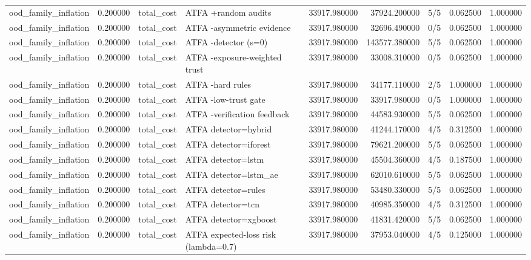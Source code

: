 \begin{tabular}{lrllrrlrr}
ood\_family\_inflation & 0.200000 & total\_cost & ATFA +random audits & 33917.980000 & 37924.200000 & 5/5 & 0.062500 & 1.000000 \\
ood\_family\_inflation & 0.200000 & total\_cost & ATFA -asymmetric evidence & 33917.980000 & 32696.490000 & 0/5 & 0.062500 & 1.000000 \\
ood\_family\_inflation & 0.200000 & total\_cost & ATFA -detector (s=0) & 33917.980000 & 143577.380000 & 5/5 & 0.062500 & 1.000000 \\
ood\_family\_inflation & 0.200000 & total\_cost & ATFA -exposure-weighted trust & 33917.980000 & 33008.310000 & 0/5 & 0.062500 & 1.000000 \\
ood\_family\_inflation & 0.200000 & total\_cost & ATFA -hard rules & 33917.980000 & 34177.110000 & 2/5 & 1.000000 & 1.000000 \\
ood\_family\_inflation & 0.200000 & total\_cost & ATFA -low-trust gate & 33917.980000 & 33917.980000 & 0/5 & 1.000000 & 1.000000 \\
ood\_family\_inflation & 0.200000 & total\_cost & ATFA -verification feedback & 33917.980000 & 44583.930000 & 5/5 & 0.062500 & 1.000000 \\
ood\_family\_inflation & 0.200000 & total\_cost & ATFA detector=hybrid & 33917.980000 & 41244.170000 & 4/5 & 0.312500 & 1.000000 \\
ood\_family\_inflation & 0.200000 & total\_cost & ATFA detector=iforest & 33917.980000 & 79621.200000 & 5/5 & 0.062500 & 1.000000 \\
ood\_family\_inflation & 0.200000 & total\_cost & ATFA detector=lstm & 33917.980000 & 45504.360000 & 4/5 & 0.187500 & 1.000000 \\
ood\_family\_inflation & 0.200000 & total\_cost & ATFA detector=lstm\_ae & 33917.980000 & 62010.610000 & 5/5 & 0.062500 & 1.000000 \\
ood\_family\_inflation & 0.200000 & total\_cost & ATFA detector=rules & 33917.980000 & 53480.330000 & 5/5 & 0.062500 & 1.000000 \\
ood\_family\_inflation & 0.200000 & total\_cost & ATFA detector=tcn & 33917.980000 & 40985.350000 & 4/5 & 0.312500 & 1.000000 \\
ood\_family\_inflation & 0.200000 & total\_cost & ATFA detector=xgboost & 33917.980000 & 41831.420000 & 5/5 & 0.062500 & 1.000000 \\
ood\_family\_inflation & 0.200000 & total\_cost & ATFA expected-loss risk (lambda=0.7) & 33917.980000 & 37953.040000 & 4/5 & 0.125000 & 1.000000 \\

\end{tabular}
